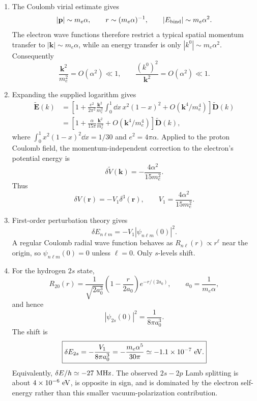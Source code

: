 \begin{enumerate}
\begin{enumerate}
\item
The Coulomb virial estimate gives
\[
 |\mathbf p|\sim m_e\alpha,\qquad
 r\sim(m_e\alpha)^{-1},\qquad
 |E_{\rm bind}|\sim m_e\alpha^2.
\]
The electron wave functions therefore restrict a typical spatial
momentum transfer to
\(|\mathbf k|\sim m_e\alpha\), while an energy transfer is only
\(|k^0|\sim m_e\alpha^2\).  Consequently
\[
 \frac{\mathbf k^2}{m_e^2}=O(\alpha^2)\ll1,
 \qquad
 \frac{(k^0)^2}{\mathbf k^2}=O(\alpha^2)\ll1.
\]
\item
Expanding the supplied logarithm gives
\[
\begin{split}
 \widetilde{\mathbf E}(k)
 &=\left[
 1+\frac{e^2}{2\pi^2}\frac{\mathbf k^2}{m_e^2}
 \int_0^1\dd x\,x^2(1-x)^2
 +O(\mathbf k^4/m_e^4)\right]\widetilde{\mathbf D}(k)\\
 &=\left[
 1+\frac{\alpha}{15\pi}\frac{\mathbf k^2}{m_e^2}
 +O(\mathbf k^4/m_e^4)\right]\widetilde{\mathbf D}(k),
\end{split}
\]
where \(\int_0^1x^2(1-x)^2\dd x=1/30\) and
\(e^2=4\pi\alpha\).  Applied to the proton Coulomb field, the
momentum-independent correction to the electron's potential energy is
\[
 \delta\widetilde V(\mathbf k)
 =-\frac{4\alpha^2}{15m_e^2}.
\]
Thus
\[
 \boxed{\delta V(\mathbf r)
 =-V_1\delta^3(\mathbf r),\qquad
 V_1=\frac{4\alpha^2}{15m_e^2}.}
\]
\item
First-order perturbation theory gives
\[
 \delta E_{n\ell m}
 =-V_1|\psi_{n\ell m}(0)|^2.
\]
A regular Coulomb radial wave function behaves as
\(R_{n\ell}(r)\propto r^\ell\) near the origin, so
\(\psi_{n\ell m}(0)=0\) unless \(\ell=0\).  Only \(s\)-levels shift.
\item
For the hydrogen \(2s\) state,
\[
 R_{20}(r)
 =\frac{1}{\sqrt{2a_0^3}}
 \left(1-\frac{r}{2a_0}\right)e^{-r/(2a_0)},
 \qquad
 a_0=\frac{1}{m_e\alpha},
\]
and hence
\[
 |\psi_{2s}(0)|^2=\frac{1}{8\pi a_0^3}.
\]
The shift is
\[
 \boxed{\delta E_{2s}
 =-\frac{V_1}{8\pi a_0^3}
 =-\frac{m_e\alpha^5}{30\pi}
 \simeq-1.1\times10^{-7}\ {\rm eV}.}
\]
Equivalently, \(\delta E/h\simeq-27\ {\rm MHz}\).  The observed
\(2s-2p\) Lamb splitting is about \(4\times10^{-6}\ {\rm eV}\), is
opposite in sign, and is dominated by the electron self-energy rather
than this smaller vacuum-polarization contribution.
\end{enumerate}


\end{enumerate}
